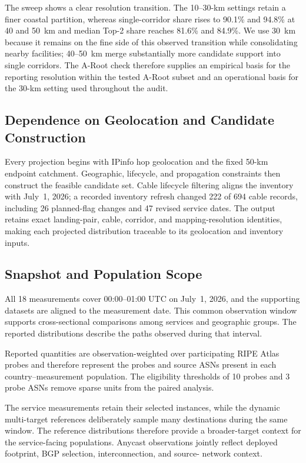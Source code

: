 The sweep shows a clear resolution transition. The 10--30-km settings retain
a finer coastal partition, whereas single-corridor share rises to 90.1\% and
94.8\% at 40 and 50~km and median Top-2 share reaches 81.6\% and 84.9\%.
We use 30~km because it remains on the fine side of this observed transition
while consolidating nearby facilities; 40--50~km merge substantially more
candidate support into single corridors. The A-Root check therefore supplies
an empirical basis for the reporting resolution within the tested A-Root
subset and an operational basis for the 30-km setting used throughout the
audit.

\subsection{Dependence on Geolocation and Candidate Construction}
\label{subsec:geolocation-scope}

Every projection begins with IPinfo hop geolocation and the fixed 50-km
endpoint catchment. Geographic, lifecycle, and propagation constraints then
construct the feasible candidate set. Cable lifecycle filtering aligns the
inventory with July~1, 2026; a recorded inventory refresh changed 222 of 694
cable records, including 26 planned-flag changes and 47 revised service dates.
The output retains exact landing-pair, cable, corridor, and mapping-resolution
identities, making each projected distribution traceable to its geolocation
and inventory inputs.

\subsection{Snapshot and Population Scope}
\label{subsec:measurement-scope}

All 18 measurements cover 00:00--01:00 UTC on July~1, 2026, and the
supporting datasets are aligned to the measurement date. This common
observation window supports cross-sectional comparisons among services
and geographic groups. The reported distributions describe the paths
observed during that interval.

Reported quantities are observation-weighted over participating RIPE Atlas
probes and therefore represent the probes and source ASNs present in each
country--measurement population. The eligibility thresholds of 10 probes and
3 probe ASNs remove sparse units from the paired analysis.

The service measurements retain their selected instances, while the dynamic
multi-target references deliberately sample many destinations during the same
window. The reference distributions therefore provide a broader-target
context for the service-facing populations. Anycast observations jointly
reflect deployed footprint, BGP selection, interconnection, and source-
network context.

